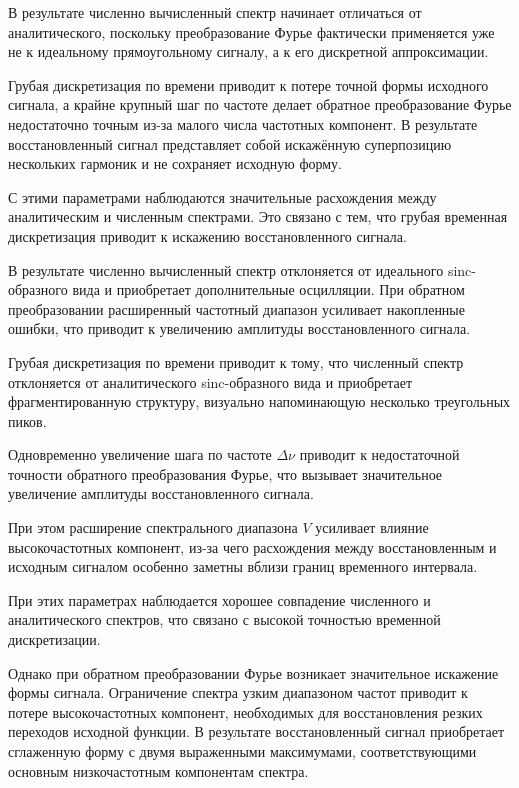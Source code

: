 \documentclass[a4paper, 12pt]{article}
\begin{document}
В результате численно вычисленный спектр начинает отличаться от аналитического, поскольку преобразование Фурье фактически применяется уже не к идеальному прямоугольному сигналу, а к его дискретной аппроксимации.

Грубая дискретизация по времени приводит к потере точной формы исходного сигнала, а крайне крупный шаг по частоте делает обратное преобразование Фурье недостаточно точным из-за малого числа частотных компонент. В результате восстановленный сигнал представляет собой искажённую суперпозицию нескольких гармоник и не сохраняет исходную форму.

С этими параметрами наблюдаются значительные расхождения между аналитическим и численным спектрами. Это связано с тем, что грубая временная дискретизация приводит к искажению восстановленного сигнала.

В результате численно вычисленный спектр отклоняется от идеального sinc-образного вида и приобретает дополнительные осцилляции. При обратном преобразовании расширенный частотный диапазон усиливает накопленные ошибки, что приводит к увеличению амплитуды восстановленного сигнала.


Грубая дискретизация по времени приводит к тому, что численный спектр отклоняется от аналитического sinc-образного вида и приобретает фрагментированную структуру, визуально напоминающую несколько треугольных пиков.

Одновременно увеличение шага по частоте $\Delta \nu$ приводит к недостаточной точности обратного преобразования Фурье, что вызывает значительное увеличение амплитуды восстановленного сигнала.

При этом расширение спектрального диапазона $V$ усиливает влияние высокочастотных компонент, из-за чего расхождения между восстановленным и исходным сигналом особенно заметны вблизи границ временного интервала.


При этих параметрах наблюдается хорошее совпадение численного и аналитического спектров, что связано с высокой точностью временной дискретизации.

Однако при обратном преобразовании Фурье возникает значительное искажение формы сигнала. Ограничение спектра узким диапазоном частот приводит к потере высокочастотных компонент, необходимых для восстановления резких переходов исходной функции. В результате восстановленный сигнал приобретает сглаженную форму с двумя выраженными максимумами, соответствующими основным низкочастотным компонентам спектра.
\end{document}
